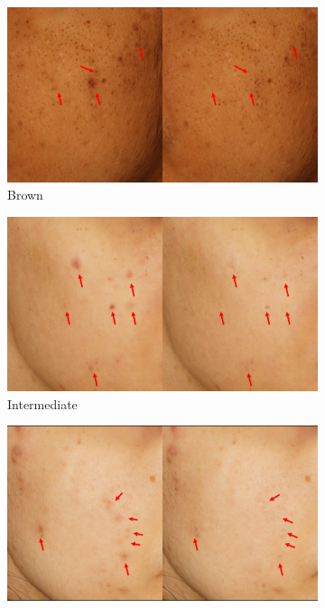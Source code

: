 \begin{appendices}
\begin{spacing}{1.5}
\begin{figure}[p]
      \begin{subfigure}{.5\textwidth}
        \centering
        \includegraphics[width=.9\linewidth]{Appendix/img/10.pdf}
        \caption{Brown}
      \end{subfigure}
    \begin{subfigure}{.5\textwidth}
        \centering
        \includegraphics[width=.9\linewidth]{Appendix/img/11.pdf}
        \caption{Intermediate}
      \end{subfigure}%
      \begin{subfigure}{.5\textwidth}
        \centering
        \includegraphics[width=.9\linewidth]{Appendix/img/12.pdf}

\end{subfigure}
\end{figure}
\end{spacing}
\end{appendices}
